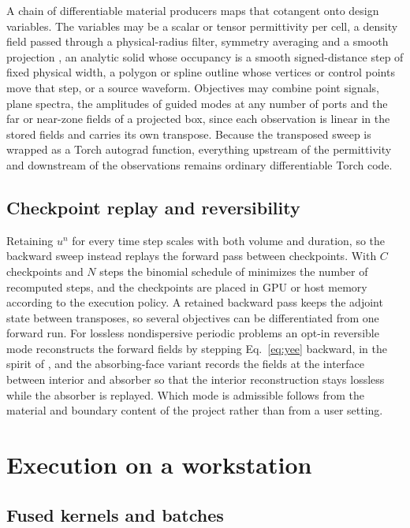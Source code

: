 \documentclass[preprint,11pt]{elsarticle}
\begin{document}
A chain of differentiable material producers maps that cotangent onto design variables. The variables may be a scalar or tensor permittivity per cell, a density field passed through a physical-radius filter, symmetry averaging and a smooth projection \citep{lazarov2011,wang2011}, an analytic solid whose occupancy is a smooth signed-distance step of fixed physical width, a polygon or spline outline whose vertices or control points move that step, or a source waveform. Objectives may combine point signals, plane spectra, the amplitudes of guided modes at any number of ports and the far or near-zone fields of a projected box, since each observation is linear in the stored fields and carries its own transpose. Because the transposed sweep is wrapped as a Torch autograd function, everything upstream of the permittivity and downstream of the observations remains ordinary differentiable Torch code.

\subsection{Checkpoint replay and reversibility}

Retaining $u^{n}$ for every time step scales with both volume and duration, so the backward sweep instead replays the forward pass between checkpoints. With $C$ checkpoints and $N$ steps the binomial schedule of \citet{griewank2000} minimizes the number of recomputed steps, and the checkpoints are placed in GPU or host memory according to the execution policy. A retained backward pass keeps the adjoint state between transposes, so several objectives can be differentiated from one forward run. For lossless nondispersive periodic problems an opt-in reversible mode reconstructs the forward fields by stepping Eq.~\eqref{eq:yee} backward, in the spirit of \citet{mahlau2024}, and the absorbing-face variant records the fields at the interface between interior and absorber so that the interior reconstruction stays lossless while the absorber is replayed. Which mode is admissible follows from the material and boundary content of the project rather than from a user setting.

\section{Execution on a workstation}
\label{sec:execution}

\subsection{Fused kernels and batches}
\end{document}

